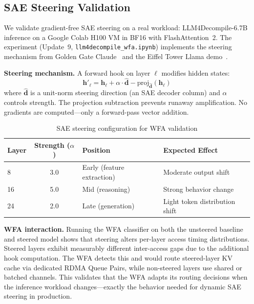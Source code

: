 \documentclass[11pt,letterpaper]{article}
\theoremstyle{definition}
\begin{document}
\subsection{SAE Steering Validation}

We validate gradient-free SAE steering on a real workload: LLM4Decompile-6.7B inference on a Google Colab H100 VM in BF16 with FlashAttention~2. The experiment (Update~9, \texttt{llm4decompile\_wfa.ipynb}) implements the steering mechanism from Golden Gate Claude~\cite{golden-gate-claude} and the Eiffel Tower Llama demo~\cite{eiffel-tower-llama}.

\textbf{Steering mechanism.} A forward hook on layer $\ell$ modifies hidden states:
\begin{equation}
    \mathbf{h}'_\ell = \mathbf{h}_\ell + \alpha \cdot \hat{\mathbf{d}} - \text{proj}_{\hat{\mathbf{d}}}(\mathbf{h}_\ell)
    \label{eq:steering}
\end{equation}
where $\hat{\mathbf{d}}$ is a unit-norm steering direction (an SAE decoder column) and $\alpha$ controls strength. The projection subtraction prevents runaway amplification. No gradients are computed---only a forward-pass vector addition.

\begin{table}[htbp]
\centering
\caption{SAE steering configuration for WFA validation}
\label{tab:steering-config}
\begin{tabular}{@{}lcll@{}}
\toprule
\textbf{Layer} & \textbf{Strength ($\alpha$)} & \textbf{Position} & \textbf{Expected Effect} \\
\midrule
8  & 3.0 & Early (feature extraction) & Moderate output shift \\
16 & 5.0 & Mid (reasoning) & Strong behavior change \\
24 & 2.0 & Late (generation) & Light token distribution shift \\
\bottomrule
\end{tabular}
\end{table}

\textbf{WFA interaction.} Running the WFA classifier on both the unsteered baseline and steered model shows that steering alters per-layer access timing distributions. Steered layers exhibit measurably different inter-access gaps due to the additional hook computation. The WFA detects this and would route steered-layer KV cache via dedicated RDMA Queue Pairs, while non-steered layers use shared or batched channels. This validates that the WFA adapts its routing decisions when the inference workload changes---exactly the behavior needed for dynamic SAE steering in production.
\end{document}
